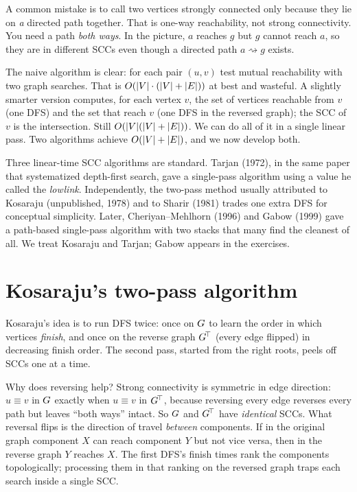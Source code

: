 \begin{trapbox}
A common mistake is to call two vertices strongly connected only because they lie on \emph{a} directed path together. That is one-way reachability, not strong connectivity. You need a path \emph{both ways}. In the picture, $a$ reaches $g$ but $g$ cannot reach $a$, so they are in different SCCs even though a directed path $a\rightsquigarrow g$ exists.
\end{trapbox}

The naive algorithm is clear: for each pair $(u,v)$ test mutual reachability with two graph searches. That is $O(\lvert V\rvert\cdot(\lvert V\rvert+\lvert E\rvert))$ at best and wasteful. A slightly smarter version computes, for each vertex $v$, the set of vertices reachable from $v$ (one DFS) and the set that reach $v$ (one DFS in the reversed graph); the SCC of $v$ is the intersection. Still $O(\lvert V\rvert(\lvert V\rvert+\lvert E\rvert))$. We can do all of it in a single linear pass. Two algorithms achieve $O(\lvert V\rvert+\lvert E\rvert)$, and we now develop both.

\begin{historybox}
Three linear-time SCC algorithms are standard. Tarjan (1972), in the same paper that systematized depth-first search, gave a single-pass algorithm using a value he called the \emph{lowlink}. Independently, the two-pass method usually attributed to Kosaraju (unpublished, 1978) and to Sharir (1981) trades one extra DFS for conceptual simplicity. Later, Cheriyan--Mehlhorn (1996) and Gabow (1999) gave a path-based single-pass algorithm with two stacks that many find the cleanest of all. We treat Kosaraju and Tarjan; Gabow appears in the exercises.
\end{historybox}

\section{Kosaraju's two-pass algorithm}
\label{ch05:kosaraju}

Kosaraju's idea is to run DFS twice: once on $G$ to learn the order in which vertices \emph{finish}, and once on the reverse graph $G^{\!\top}$ (every edge flipped) in decreasing finish order. The second pass, started from the right roots, peels off SCCs one at a time.

\begin{intuitionbox}
Why does reversing help? Strong connectivity is symmetric in edge direction: $u\equiv v$ in $G$ exactly when $u\equiv v$ in $G^{\!\top}$, because reversing every edge reverses every path but leaves ``both ways'' intact. So $G$ and $G^{\!\top}$ have \emph{identical} SCCs. What reversal flips is the direction of travel \emph{between} components. If in the original graph component $X$ can reach component $Y$ but not vice versa, then in the reverse graph $Y$ reaches $X$. The first DFS's finish times rank the components topologically; processing them in that ranking on the reversed graph traps each search inside a single SCC.
\end{intuitionbox}

